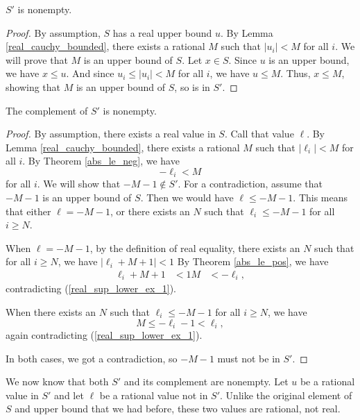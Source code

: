 \documentclass[../../math.tex]{subfiles}
\begin{document}
\begin{lemma}
    $S'$ is nonempty.
\end{lemma}
\begin{proof}
    By assumption, $S$ has a real upper bound $u$.  By Lemma
    \ref{real_cauchy_bounded}, there exists a rational $M$ such that $|u_i| < M$
    for all $i$.  We will prove that $M$ is an upper bound of $S$.  Let $x \in
    S$.  Since $u$ is an upper bound, we have $x \leq u$.  And since $u_i \leq
    |u_i| < M$ for all $i$, we have $u \leq M$.  Thus, $x \leq M$, showing that
    $M$ is an upper bound of $S$, so is in $S'$.
\end{proof}

\begin{lemma}
    The complement of $S'$ is nonempty.
\end{lemma}
\begin{proof}
    By assumption, there exists a real value in $S$.  Call that value $\ell$.
    By Lemma \ref{real_cauchy_bounded}, there exists a rational $M$ such that
    $|\ell_i| < M$ for all $i$.  By Theorem \ref{abs_le_neg}, we have
    \begin{equation} \label{real_sup_lower_ex_1}
        -\ell_i < M
    \end{equation}
    for all $i$.  We will show that $-M - 1 \notin S'$.  For a contradiction,
    assume that $-M - 1$ is an upper bound of $S$.  Then we would have $\ell
    \leq -M - 1$.  This means that either $\ell = -M - 1$, or there exists an
    $N$ such that $\ell_i \leq -M - 1$ for all $i \geq N$.

    When $\ell = -M - 1$, by the definition of real equality, there exists an
    $N$ such that for all $i \geq N$, we have $|\ell_i + M + 1| < 1$  By Theorem
    \ref{abs_le_pos}, we have
    \begin{align*}
        \ell_i + M + 1 &< 1
        M &< -\ell_i,
    \end{align*}
    contradicting (\ref{real_sup_lower_ex_1}).

    When there exists an $N$ such that $\ell_i \leq -M - 1$ for all $i \geq N$,
    we have
    \[
        M \leq -\ell_i - 1 < \ell_i,
    \]
    again contradicting (\ref{real_sup_lower_ex_1}).

    In both cases, we got a contradiction, so $-M - 1$ must not be in $S'$.
\end{proof}

We now know that both $S'$ and its complement are nonempty.  Let $u$ be a
rational value in $S'$ and let $\ell$ be a rational value not in $S'$.  Unlike
the original element of $S$ and upper bound that we had before, these two values
are rational, not real.
\end{document}
